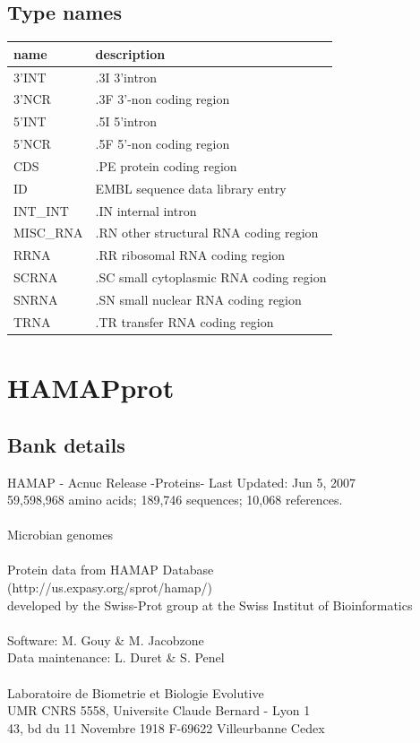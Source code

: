\documentclass{article}
\begin{document}
\begin{Schunk}
\subsection{Type names}
\noindent\begin{tabular}{ll}
\hline \hline
name & description\\
\hline
3'INT & .3I 3'intron \\
3'NCR & .3F  3'-non coding region \\
5'INT & .5I 5'intron \\
5'NCR & .5F  5'-non coding region \\
CDS & .PE protein coding region \\
ID & EMBL sequence data library entry \\
INT\_INT & .IN  internal intron \\
MISC\_RNA & .RN other structural RNA coding region \\
RRNA & .RR ribosomal RNA coding region \\
SCRNA & .SC small cytoplasmic RNA coding region \\
SNRNA & .SN small nuclear RNA coding region \\
TRNA & .TR transfer RNA coding region \\
\hline \hline
\end{tabular}

\section{ HAMAPprot }
\subsection{Bank details}
HAMAP - Acnuc Release -Proteins- Last Updated: Jun  5, 2007\\
59,598,968 amino acids; 189,746 sequences; 10,068 references.\\
\\
Microbian genomes\\
\\
Protein data from  HAMAP Database\\
(http://us.expasy.org/sprot/hamap/)\\
developed by the Swiss-Prot group at the Swiss Institut of Bioinformatics\\
\\
Software: M. Gouy \& M. Jacobzone\\
Data maintenance: L. Duret \& S. Penel\\
\\
Laboratoire de Biometrie et Biologie Evolutive\\
UMR CNRS 5558, Universite Claude Bernard - Lyon 1\\
43, bd du 11 Novembre 1918 F-69622 Villeurbanne Cedex\\



\end{Schunk}
\end{document}
